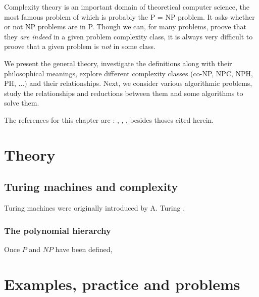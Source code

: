 Complexity theory is an important domain of theoretical computer science, the most famous problem of which is probably the \og P = NP \fg problem. It asks whether or not NP problems are in P. Though we can, for many problems, proove that they \textit{are indeed} in a given problem complexity class, it is always very difficult to proove that a given problem is \textit{not} in some class.

We present the general theory, investigate the definitions along with their philosophical meanings, explore different complexity classes (co-NP, NPC, NPH, PH, ...) and their relationships. Next, we consider various algorithmic problems, study the relationships and reductions between them and some algorithms to solve them.

The references for this chapter are : \cite{gowers2023}, \cite{gowers2024}, \cite{hudry2024}, besides thoses cited herein.

\section{Theory}

\subsection{Turing machines and complexity}

Turing machines were originally introduced by A. Turing \cite{turing1936} \cite{turing1992}.

\subsubsection{The polynomial hierarchy}



Once $P$ and $NP$ have been defined,

\section{Examples, practice and problems}